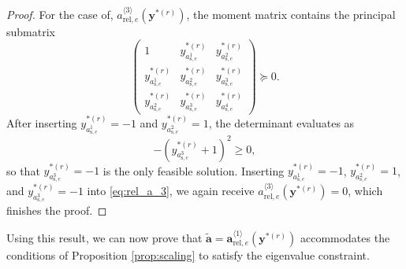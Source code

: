\documentclass[final,onefignum,onetabnum]{siamart220329}
\newtheorem*{proof}{Proof}%
\begin{document}
\begin{proposition}
\begin{proof}
		For the case of, $a_{\mathrm{rel},e}^{\langle 3\rangle}(\mathbf{y}^{*(r)})$, the moment matrix contains the principal submatrix
		\begin{equation}
			\begin{pmatrix}
				1 & y_{a_{\mathrm{s},e}^1}^{*(r)} & y_{a_{\mathrm{s},e}^2}^{*(r)}\\
				y_{a_{\mathrm{s},e}^1}^{*(r)} & y_{a_{\mathrm{s},e}^2}^{*(r)} & y_{a_{\mathrm{s},e}^3}^{*(r)}\\
				y_{a_{\mathrm{s},e}^2}^{*(r)} & y_{a_{\mathrm{s},e}^3}^{*(r)} & y_{a_{\mathrm{s},e}^4}^{*(r)}
			\end{pmatrix} \succeq 0.
		\end{equation}
		After inserting $y_{a_{\mathrm{s},e}^1}^{*(r)} = -1$ and $y_{a_{\mathrm{s},e}^2}^{*(r)} = 1$, the determinant evaluates as
		\begin{equation}
			- \left(y_{a_{\mathrm{s},e}^3}^{*(r)} + 1\right)^2 \ge 0,
		\end{equation}
		so that $y_{a_{\mathrm{s},e}^3}^{*(r)}=-1$ is the only feasible solution. Inserting $y_{a_{\mathrm{s},e}^1}^{*(r)} = -1$, $y_{a_{\mathrm{s},e}^2}^{*(r)} = 1$, and $y_{a_{\mathrm{s},e}^3}^{*(r)} = -1$ into \eqref{eq:rel_a_3}, we again receive $a_{\mathrm{rel},e}^{\langle 3\rangle}(\mathbf{y}^{*(r)})=0$, which finishes the proof.
	\end{proof}
\end{proposition}

Using this result, we can now prove that $\tilde{\mathbf{a}} = \mathbf{a}_{\mathrm{rel},e}^{\langle 1\rangle}(\mathbf{y}^{*(r)})$ accommodates the conditions of Proposition \ref{prop:scaling} to satisfy the eigenvalue constraint.
\end{document}
